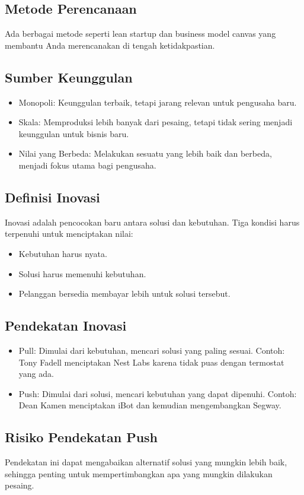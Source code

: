 \documentclass{article}
\begin{document}
\subsection{Metode Perencanaan}
Ada berbagai metode seperti lean startup dan business model canvas yang membantu Anda merencanakan di tengah ketidakpastian.

\subsection{Sumber Keunggulan}
\begin{itemize}
    \item Monopoli: Keunggulan terbaik, tetapi jarang relevan untuk pengusaha baru.
    \item Skala: Memproduksi lebih banyak dari pesaing, tetapi tidak sering menjadi keunggulan untuk bisnis baru.
    \item Nilai yang Berbeda: Melakukan sesuatu yang lebih baik dan berbeda, menjadi fokus utama bagi pengusaha.
\end{itemize}

\subsection{Definisi Inovasi}
Inovasi adalah pencocokan baru antara solusi dan kebutuhan. Tiga kondisi harus terpenuhi untuk menciptakan nilai:
\begin{itemize}
    \item Kebutuhan harus nyata.
    \item Solusi harus memenuhi kebutuhan.
    \item Pelanggan bersedia membayar lebih untuk solusi tersebut.
\end{itemize}

\subsection{Pendekatan Inovasi}
\begin{itemize}
    \item Pull: Dimulai dari kebutuhan, mencari solusi yang paling sesuai. Contoh: Tony Fadell menciptakan Nest Labs karena tidak puas dengan termostat yang ada.
    \item Push: Dimulai dari solusi, mencari kebutuhan yang dapat dipenuhi. Contoh: Dean Kamen menciptakan iBot dan kemudian mengembangkan Segway.
\end{itemize}

\subsection{Risiko Pendekatan Push}
Pendekatan ini dapat mengabaikan alternatif solusi yang mungkin lebih baik, sehingga penting untuk mempertimbangkan apa yang mungkin dilakukan pesaing.
\end{document}
